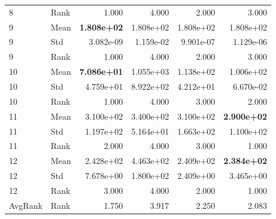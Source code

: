 \begin{table}[t]
\begin{tabular}{llrrrr}
8 & Rank & 1.000 & 4.000 & 2.000 & 3.000 \\
9 & Mean & \textbf{1.808e+02} & 1.808e+02 & 1.808e+02 & 1.808e+02 \\
9 & Std & 3.082e-09 & 1.159e-02 & 9.901e-07 & 1.129e-06 \\
9 & Rank & 1.000 & 4.000 & 2.000 & 3.000 \\
10 & Mean & \textbf{7.086e+01} & 1.055e+03 & 1.138e+02 & 1.006e+02 \\
10 & Std & 4.759e+01 & 8.922e+02 & 4.212e+01 & 6.670e-02 \\
10 & Rank & 1.000 & 4.000 & 3.000 & 2.000 \\
11 & Mean & 3.100e+02 & 3.400e+02 & 3.100e+02 & \textbf{2.900e+02} \\
11 & Std & 1.197e+02 & 5.164e+01 & 1.663e+02 & 1.100e+02 \\
11 & Rank & 2.000 & 4.000 & 3.000 & 1.000 \\
12 & Mean & 2.428e+02 & 4.463e+02 & 2.409e+02 & \textbf{2.384e+02} \\
12 & Std & 7.678e+00 & 1.800e+02 & 2.409e+00 & 3.465e+00 \\
12 & Rank & 3.000 & 4.000 & 2.000 & 1.000 \\
AvgRank & Rank & 1.750 & 3.917 & 2.250 & 2.083 \\
\hline
\end{tabular}
\end{table}
